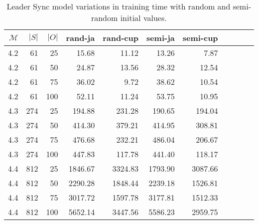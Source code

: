 \begin{table}
    \centering
    \caption{Leader Sync model variations in training time with random and semi-random initial values.}
    \label{tab:leader_results_rand_vs_semi}
    \begin{tabular}{rrrrrrrrrrr}
        \toprule
        $\mathcal{M}$ & $|S|$ & $|O|$ & rand-ja & rand-cup & semi-ja & semi-cup \\
        \midrule
        4.2           & 61    & 25    & 15.68   & 11.12    & 13.26   & 7.87     \\
        4.2           & 61    & 50    & 24.87   & 13.56    & 28.32   & 12.54    \\
        4.2           & 61    & 75    & 36.02   & 9.72     & 38.62   & 10.54    \\
        4.2           & 61    & 100   & 52.11   & 11.24    & 53.75   & 10.95    \\
        4.3           & 274   & 25    & 194.88  & 231.28   & 190.65  & 194.04   \\
        4.3           & 274   & 50    & 414.30  & 379.21   & 414.95  & 308.81   \\
        4.3           & 274   & 75    & 476.68  & 232.21   & 486.04  & 206.67   \\
        4.3           & 274   & 100   & 447.83  & 117.78   & 441.40  & 118.17   \\
        4.4           & 812   & 25    & 1846.67 & 3324.83  & 1793.90 & 3087.66  \\
        4.4           & 812   & 50    & 2290.28 & 1848.44  & 2239.18 & 1526.81  \\
        4.4           & 812   & 75    & 3017.72 & 1597.78  & 3177.81 & 1512.33  \\
        4.4           & 812   & 100   & 5652.14 & 3447.56  & 5586.23 & 2959.75  \\
        \bottomrule
    \end{tabular}
\end{table}

